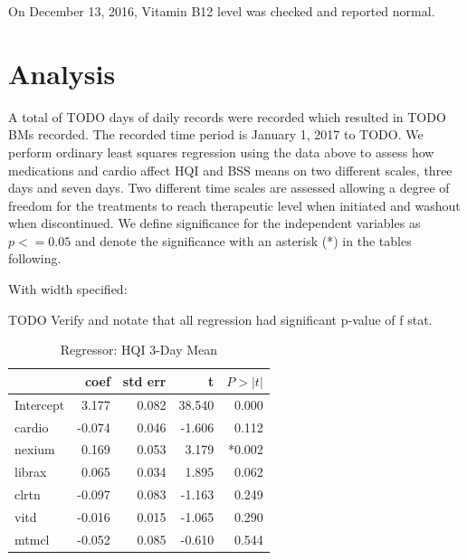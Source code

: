 \documentclass[conference]{IEEEtran}
\begin{document}
On December 13, 2016, Vitamin B12 level was checked and reported normal.



\section{Analysis}

A total of TODO days of daily records were recorded which resulted in TODO BMs recorded.  The recorded time period is January 1, 2017 to TODO. We perform ordinary least squares regression using the data above to assess how medications and cardio affect HQI and BSS means on two different scales, three days and seven days.  Two different time scales are assessed allowing a degree of freedom for the treatments to reach therapeutic level when initiated and washout when discontinued. We define significance for the independent variables as $p <= 0.05$ and denote the significance with an asterisk (*) in the tables following.

With width specified:

TODO Verify and notate that all regression had significant p-value of f stat.

\begin{table}
\begin{center}
\caption {Regressor: HQI 3-Day Mean} \label{tab:hqi_3daymean} 
    \begin{tabular}{ | l | r | r | r | r |}
    \hline
     & coef & std err & t & $P>\left|t\right|$ \\ \hline
Intercept & 3.177 & 0.082 & 38.540 & 0.000 \\
cardio & -0.074 & 0.046 & -1.606 & 0.112 \\
nexium & 0.169 & 0.053 & 3.179 & *0.002 \\
librax & 0.065 & 0.034 & 1.895 & 0.062 \\
clrtn & -0.097 & 0.083 & -1.163 & 0.249 \\
vitd & -0.016 & 0.015 & -1.065 & 0.290 \\
mtmcl & -0.052 & 0.085 & -0.610 & 0.544 \\
    \hline
\end{tabular}
\end{center}
    \end{table}
\end{document}
